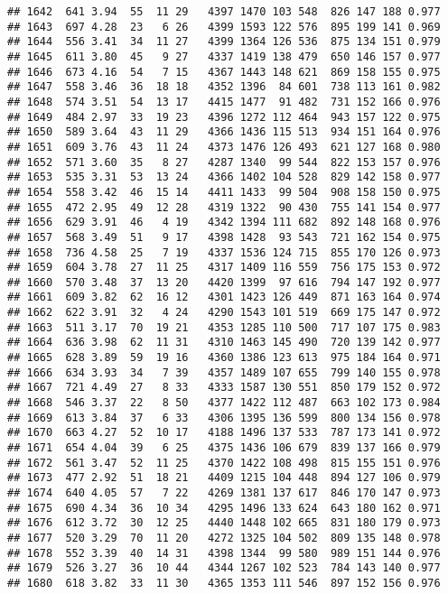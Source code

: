 \documentclass[]{article}
\begin{document}
\begin{verbatim}
## 1642  641 3.94  55  11 29   4397 1470 103 548  826 147 188 0.977
## 1643  697 4.28  23   6 26   4399 1593 122 576  895 199 141 0.969
## 1644  556 3.41  34  11 27   4399 1364 126 536  875 134 151 0.979
## 1645  611 3.80  45   9 27   4337 1419 138 479  650 146 157 0.977
## 1646  673 4.16  54   7 15   4367 1443 148 621  869 158 155 0.975
## 1647  558 3.46  36  18 18   4352 1396  84 601  738 113 161 0.982
## 1648  574 3.51  54  13 17   4415 1477  91 482  731 152 166 0.976
## 1649  484 2.97  33  19 23   4396 1272 112 464  943 157 122 0.975
## 1650  589 3.64  43  11 29   4366 1436 115 513  934 151 164 0.976
## 1651  609 3.76  43  11 24   4373 1476 126 493  621 127 168 0.980
## 1652  571 3.60  35   8 27   4287 1340  99 544  822 153 157 0.976
## 1653  535 3.31  53  13 24   4366 1402 104 528  829 142 158 0.977
## 1654  558 3.42  46  15 14   4411 1433  99 504  908 158 150 0.975
## 1655  472 2.95  49  12 28   4319 1322  90 430  755 141 154 0.977
## 1656  629 3.91  46   4 19   4342 1394 111 682  892 148 168 0.976
## 1657  568 3.49  51   9 17   4398 1428  93 543  721 162 154 0.975
## 1658  736 4.58  25   7 19   4337 1536 124 715  855 170 126 0.973
## 1659  604 3.78  27  11 25   4317 1409 116 559  756 175 153 0.972
## 1660  570 3.48  37  13 20   4420 1399  97 616  794 147 192 0.977
## 1661  609 3.82  62  16 12   4301 1423 126 449  871 163 164 0.974
## 1662  622 3.91  32   4 24   4290 1543 101 519  669 175 147 0.972
## 1663  511 3.17  70  19 21   4353 1285 110 500  717 107 175 0.983
## 1664  636 3.98  62  11 31   4310 1463 145 490  720 139 142 0.977
## 1665  628 3.89  59  19 16   4360 1386 123 613  975 184 164 0.971
## 1666  634 3.93  34   7 39   4357 1489 107 655  799 140 155 0.978
## 1667  721 4.49  27   8 33   4333 1587 130 551  850 179 152 0.972
## 1668  546 3.37  22   8 50   4377 1422 112 487  663 102 173 0.984
## 1669  613 3.84  37   6 33   4306 1395 136 599  800 134 156 0.978
## 1670  663 4.27  52  10 17   4188 1496 137 533  787 173 141 0.972
## 1671  654 4.04  39   6 25   4375 1436 106 679  839 137 166 0.979
## 1672  561 3.47  52  11 25   4370 1422 108 498  815 155 151 0.976
## 1673  477 2.92  51  18 21   4409 1215 104 448  894 127 106 0.979
## 1674  640 4.05  57   7 22   4269 1381 137 617  846 170 147 0.973
## 1675  690 4.34  36  10 34   4295 1496 133 624  643 180 162 0.971
## 1676  612 3.72  30  12 25   4440 1448 102 665  831 180 179 0.973
## 1677  520 3.29  70  11 20   4272 1325 104 502  809 135 148 0.978
## 1678  552 3.39  40  14 31   4398 1344  99 580  989 151 144 0.976
## 1679  526 3.27  36  10 44   4344 1267 102 523  784 143 140 0.977
## 1680  618 3.82  33  11 30   4365 1353 111 546  897 152 156 0.976

\end{verbatim}
\end{document}
